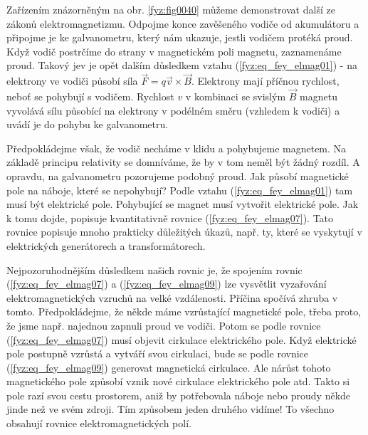     Zařízením znázorněným na obr. \ref{fyz:fig0040} můžeme demonstrovat další ze zákonů   
    elektromagnetizmu. Odpojme konce zavěšeného vodiče od akumulátoru a připojme je ke 
    galvanometru, který nám ukazuje, jestli vodičem protéká proud. Když vodič postrčíme do strany v 
    magnetickém poli magnetu, zaznamenáme proud. Takový jev je opět dalším důsledkem vztahu 
    (\ref{fyz:eq_fey_elmag01}) - na elektrony ve vodiči působí síla \(\vec{F}=q\vec{v} 
    \times\vec{B}\). Elektrony mají příčnou rychlost, neboť se pohybují s vodičem. Rychlost \(v\) v 
    kombinaci se svislým \(\vec{B}\) magnetu vyvolává sílu působící na elektrony v podélném směru 
    (vzhledem k vodiči) a uvádí je do pohybu ke galvanometru.      

    Předpokládejme však, že vodič necháme v klidu a pohybujeme magnetem. Na základě principu 
    relativity se domníváme, že by v tom neměl být žádný rozdíl. A opravdu, na galvanometru 
    pozorujeme podobný proud. Jak působí magnetické pole na náboje, které se nepohybují? Podle 
    vztahu (\ref{fyz:eq_fey_elmag01}) tam musí být elektrické pole. Pohybující se magnet musí 
    vytvořit elektrické pole. Jak k tomu dojde, popisuje kvantitativně rovnice 
    (\ref{fyz:eq_fey_elmag07}). Tato rovnice popisuje mnoho prakticky důležitých úkazů, např. ty, 
    které se vyskytují v elektrických generátorech a transformátorech.
    
    Nejpozoruhodnějším důsledkem našich rovnic je, že spojením rovnic (\ref{fyz:eq_fey_elmag07}) a
    (\ref{fyz:eq_fey_elmag09}) lze vysvětlit vyzařování elektromagnetických vzruchů na velké 
    vzdálenosti. Příčina spočívá zhruba v tomto. Předpokládejme, že někde máme vzrůstající 
    magnetické pole, třeba proto, že jsme např. najednou zapnuli proud ve vodiči. Potom se podle 
    rovnice (\ref{fyz:eq_fey_elmag07}) musí objevit cirkulace elektrického pole. Když elektrické 
    pole postupně vzrůstá a vytváří svou cirkulaci, bude se podle rovnice 
    (\ref{fyz:eq_fey_elmag09}) generovat magnetická cirkulace. Ale nárůst tohoto magnetického pole 
    způsobí vznik nové cirkulace elektrického pole atd. Takto si pole razí svou cestu prostorem, 
    aniž by potřebovala náboje nebo proudy někde jinde než ve svém zdroji. Tím způsobem jeden 
    druhého vidíme! To všechno obsahují rovnice elektromagnetických polí.
    
